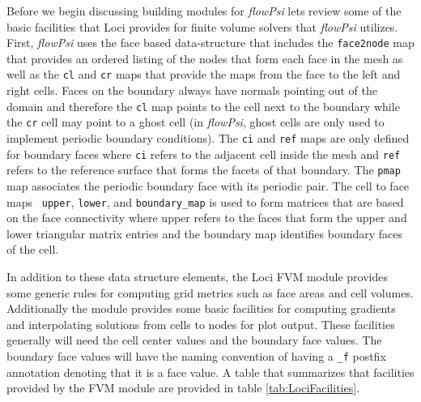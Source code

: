 \documentclass[letterpaper,twoside]{article}
\begin{document}
Before we begin discussing building modules for {\it flowPsi} lets review some
of the basic facilities that Loci provides for finite volume solvers
that {\it flowPsi} utilizes.  First, {\it flowPsi} uses the face based data-structure
that includes the {\tt face2node} map that provides an ordered listing of
the nodes that form each face in the mesh as well as the {\tt cl} and
{\tt cr} maps that provide the maps from the face to the left and
right cells.  Faces on the boundary always have normals pointing out
of the domain and therefore the {\tt cl} map points to the cell next
to the boundary while the {\tt cr} cell may point to a ghost cell (in
{\it flowPsi}, ghost cells are only used to implement periodic boundary
conditions).  The {\tt ci} and {\tt ref} maps are only defined for
boundary faces where {\tt ci} refers to the adjacent cell inside the
mesh and {\tt ref} refers to the reference surface that forms the
facets of that boundary.  The {\tt pmap} map associates the periodic
boundary face with its periodic pair.  The cell to face maps {\tt
  upper}, {\tt lower}, and {\tt boundary\_map} is used to form
matrices that are based on the face connectivity where upper refers
to the faces that form the upper and lower triangular matrix entries
and the boundary map identifies boundary faces of the cell.


In addition to these data structure elements, the Loci FVM module
provides some generic rules for computing grid metrics such as face
areas and cell volumes.  Additionally the module provides some basic
facilities for computing gradients and interpolating solutions from
cells to nodes for plot output.  These facilities generally will need
the cell center values and the boundary face values.  The boundary
face values will have the naming convention of having a {\tt \_f}
postfix annotation denoting that it is a face value.  A table that
summarizes that facilities provided by the FVM module are provided in
table \ref{tab:LociFacilities}.
\end{document}

